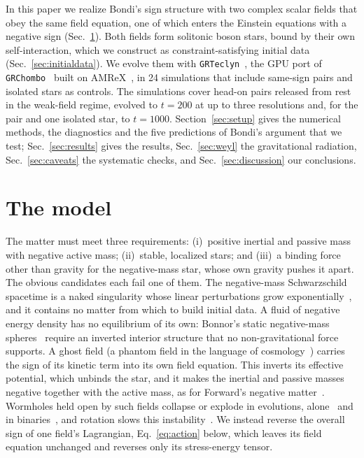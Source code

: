 \documentclass[twocolumn,floatfix,aps,prd,superscriptaddress,nofootinbib]{revtex4-2}
\begin{document}
In this paper we realize Bondi's sign structure with two complex scalar fields that obey the same field equation, one of which enters the Einstein equations with a negative sign (Sec.~\ref{sec:model}). Both fields form solitonic boson stars, bound by their own self-interaction, which we construct as constraint-satisfying initial data (Sec.~\ref{sec:initialdata}). We evolve them with \texttt{GRTeclyn}~\cite{grteclyn}, the GPU port of \texttt{GRChombo}~\cite{grchombo} built on AMReX~\cite{amrex}, in 24 simulations that include same-sign pairs and isolated stars as controls. The simulations cover head-on pairs released from rest in the weak-field regime, evolved to $t=200$ at up to three resolutions and, for the pair and one isolated star, to $t=1000$. Section~\ref{sec:setup} gives the numerical methods, the diagnostics and the five predictions of Bondi's argument that we test; Sec.~\ref{sec:results} gives the results, Sec.~\ref{sec:weyl} the gravitational radiation, Sec.~\ref{sec:caveats} the systematic checks, and Sec.~\ref{sec:discussion} our conclusions.

\section{The model}
\label{sec:model}

The matter must meet three requirements: (i)~positive inertial and passive mass with negative active mass; (ii)~stable, localized stars; and (iii)~a binding force other than gravity for the negative-mass star, whose own gravity pushes it apart. The obvious candidates each fail one of them. The negative-mass Schwarzschild spacetime is a naked singularity whose linear perturbations grow exponentially~\cite{gleiser2006}, and it contains no matter from which to build initial data. A fluid of negative energy density has no equilibrium of its own: Bonnor's static negative-mass spheres~\cite{bonnor1989} require an inverted interior structure that no non-gravitational force supports. A ghost field (a phantom field in the language of cosmology~\cite{caldwell2002}) carries the sign of its kinetic term into its own field equation. This inverts its effective potential, which unbinds the star, and it makes the inertial and passive masses negative together with the active mass, as for Forward's negative matter~\cite{forward1990}. Wormholes held open by such fields collapse or explode in evolutions, alone~\cite{shinkai2002,gonzalez2009,shirokov2026} and in binaries~\cite{shirokov_merger2026}, and rotation slows this instability~\cite{shirokov_spin2026}. We instead reverse the overall sign of one field's Lagrangian, Eq.~\eqref{eq:action} below, which leaves its field equation unchanged and reverses only its stress-energy tensor.
\end{document}
